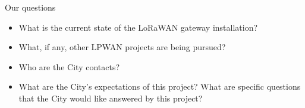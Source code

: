 \documentclass{beamer}
\begin{document}
    \begin{frame}{Our questions}
        \begin{itemize}
            \item What is the current state of the LoRaWAN gateway installation?
            \item What, if any, other LPWAN projects are being pursued?
            \item Who are the City contacts?
            \item What are the City's expectations of this project? What are specific questions that the City would like answered by this project?
        \end{itemize}
    \end{frame}
\end{document}

